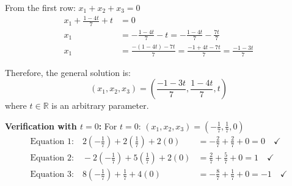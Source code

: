 From the first row: $x_1 + x_2 + x_3 = 0$
\begin{align*}
x_1 + \frac{1-4t}{7} + t &= 0\\
x_1 &= -\frac{1-4t}{7} - t = -\frac{1-4t}{7} - \frac{7t}{7}\\
x_1 &= \frac{-(1-4t) - 7t}{7} = \frac{-1+4t-7t}{7} = \frac{-1-3t}{7}
\end{align*}

Therefore, the general solution is:
\[
\boxed{(x_1, x_2, x_3) = \left(\frac{-1-3t}{7}, \frac{1-4t}{7}, t\right)}
\]
where $t \in \mathbb{R}$ is an arbitrary parameter.

\textbf{Verification with $t = 0$:}
For $t = 0$: $(x_1, x_2, x_3) = \left(-\frac{1}{7}, \frac{1}{7}, 0\right)$
\begin{align*}
\text{Equation 1:} \quad 2\left(-\frac{1}{7}\right) + 2\left(\frac{1}{7}\right) + 2(0) &= -\frac{2}{7} + \frac{2}{7} + 0 = 0 \quad \checkmark\\
\text{Equation 2:} \quad -2\left(-\frac{1}{7}\right) + 5\left(\frac{1}{7}\right) + 2(0) &= \frac{2}{7} + \frac{5}{7} + 0 = 1 \quad \checkmark\\
\text{Equation 3:} \quad 8\left(-\frac{1}{7}\right) + \frac{1}{7} + 4(0) &= -\frac{8}{7} + \frac{1}{7} + 0 = -1 \quad \checkmark
\end{align*}